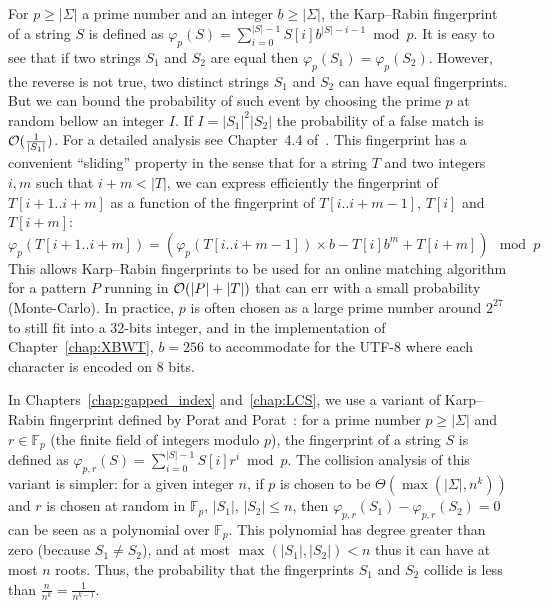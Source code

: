 For $p \geq |\Sigma|$ a prime number and an integer $b\geq |\Sigma|$, the Karp--Rabin fingerprint~\cite{DBLP:journals/ibmrd/KarpR87} of a string $S$ is defined as
$\varphi_{p}(S) = \sum_{i = 0}^{|S|-1}  S[i]b^{|S|-i-1} \bmod p$.
It is easy to see that if two strings $S_1$ and $S_2$ are equal then $\varphi_p(S_1) = \varphi_p(S_2)$. However, the reverse is not true, two distinct strings $S_1$ and $S_2$ can have equal fingerprints.
%
But we can bound the probability of such event by choosing the prime $p$ at random bellow an integer $I$. If $I=|S_1|^2|S_2|$ the probability of a false match is $\mathcal{O}(\frac{1}{|S_1|})$. For a detailed analysis see Chapter~4.4 of~\cite{Gusfield1997}.
This fingerprint has a convenient ``sliding'' property in the sense that for a string $T$ and two integers $i,m$ such that $i+m < |T|$, we can express efficiently the fingerprint of $T[i+1..i+m]$ as a function of the fingerprint of $T[i..i+m-1]$, $T[i]$ and $T[i+m]$:
$$ \varphi_{p}(T[i+1..i+m]) = ( \varphi_{p}(T[i..i+m-1])\times b - T[i]b^{m} + T[i+m]  ) \mod p$$
This allows Karp--Rabin fingerprints to be used for an online matching algorithm for a pattern $P$ running in $\mathcal{O}(|P|+|T|)$ that can err with a small probability (Monte-Carlo).
In practice, $p$ is often chosen as a large prime number around $2^{27}$ to still fit into a 32-bits integer, and in the implementation of Chapter~\ref{chap:XBWT}, $b=256$ to accommodate for the UTF-8 where each character is encoded on 8 bits.

In Chapters~\ref{chap:gapped_index} and~\ref{chap:LCS}, we use a variant of Karp--Rabin fingerprint defined by Porat and Porat~\cite{Porat:09}: 
for a prime number $p\geq |\Sigma|$  and $r \in \mathbb{F}_p$ (the finite field of integers modulo $p$), the fingerprint of a string $S$ is defined as
$\varphi_{p,r}(S) = \sum_{i = 0}^{|S|-1}  S[i]r^{i} \bmod p$.
The collision analysis of this variant is simpler: %
for a given integer $n$, if $p$ is chosen to be $\Theta(\max(|\Sigma|,n^k))$ and $r$ is chosen at random in $\mathbb{F}_p$, $|S_1|$, $|S_2|\leq n$, then $\varphi_{p,r}(S_1) - \varphi_{p,r}(S_2) = 0$ can be seen as a polynomial over $\mathbb{F}_p$. This polynomial has degree greater than zero (because $S_1 \neq S_2$), and at most $\max(|S_1|,|S_2|) < n$ thus it can have at most $n$ roots. Thus, the probability that the fingerprints $S_1$ and $S_2$ collide is less than $\frac{n}{n^k} = \frac{1}{n^{k-1}}$.


